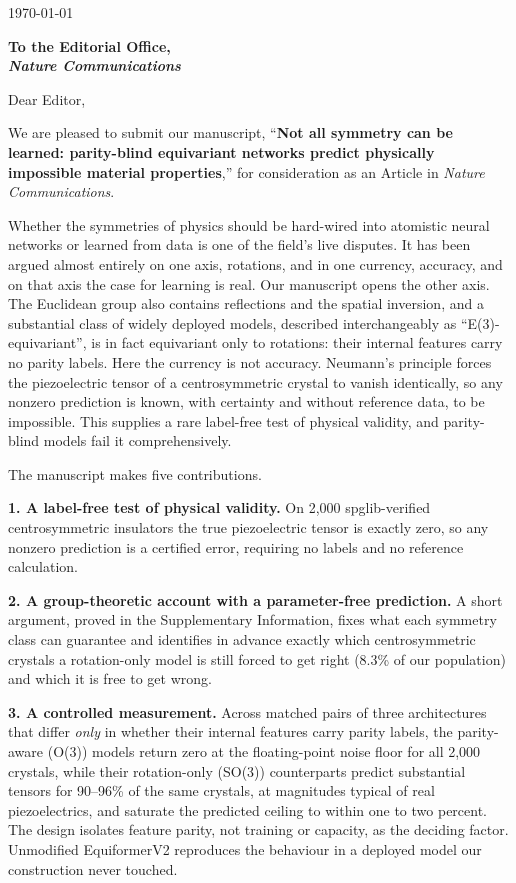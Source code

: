 \documentclass[11pt]{article}
\begin{document}
\begin{flushright}
\today
\end{flushright}

\textbf{To the Editorial Office, \\ \textit{Nature Communications}}

Dear Editor,

We are pleased to submit our manuscript, ``\textbf{Not all symmetry can be learned: parity-blind equivariant networks predict physically impossible material properties},'' for consideration as an Article in \textit{Nature Communications}.

Whether the symmetries of physics should be hard-wired into atomistic neural networks or learned from data is one of the field's live disputes. It has been argued almost entirely on one axis, rotations, and in one currency, accuracy, and on that axis the case for learning is real. Our manuscript opens the other axis. The Euclidean group also contains reflections and the spatial inversion, and a substantial class of widely deployed models, described interchangeably as ``E(3)-equivariant'', is in fact equivariant only to rotations: their internal features carry no parity labels. Here the currency is not accuracy. Neumann's principle forces the piezoelectric tensor of a centrosymmetric crystal to vanish identically, so any nonzero prediction is known, with certainty and without reference data, to be impossible. This supplies a rare label-free test of physical validity, and parity-blind models fail it comprehensively.

The manuscript makes five contributions.

\textbf{1. A label-free test of physical validity.} On 2,000 spglib-verified centrosymmetric insulators the true piezoelectric tensor is exactly zero, so any nonzero prediction is a certified error, requiring no labels and no reference calculation.

\textbf{2. A group-theoretic account with a parameter-free prediction.} A short argument, proved in the Supplementary Information, fixes what each symmetry class can guarantee and identifies in advance exactly which centrosymmetric crystals a rotation-only model is still forced to get right (8.3\% of our population) and which it is free to get wrong.

\textbf{3. A controlled measurement.} Across matched pairs of three architectures that differ \emph{only} in whether their internal features carry parity labels, the parity-aware (O(3)) models return zero at the floating-point noise floor for all 2,000 crystals, while their rotation-only (SO(3)) counterparts predict substantial tensors for 90--96\% of the same crystals, at magnitudes typical of real piezoelectrics, and saturate the predicted ceiling to within one to two percent. The design isolates feature parity, not training or capacity, as the deciding factor. Unmodified EquiformerV2 reproduces the behaviour in a deployed model our construction never touched.
\end{document}
